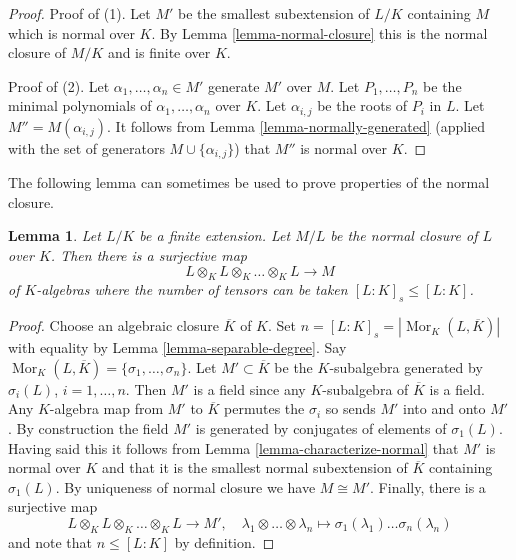\documentclass{stacks-project}
\theoremstyle{plain}
\newtheorem{lemma}[subsection]{Lemma}
\theoremstyle{definition}
\theoremstyle{remark}
\numberwithin{equation}{subsection}
\def\Mor{\mathop{\mathrm{Mor}}\nolimits}
\begin{document}
\begin{proof}
Proof of (1). Let $M'$ be the smallest subextension of $L/K$ containing $M$
which is normal over $K$. By Lemma \ref{lemma-normal-closure}
this is the normal closure of $M/K$ and is finite over $K$.

\medskip\noindent
Proof of (2). Let $\alpha_1, \ldots, \alpha_n \in M'$ generate $M'$ over $M$.
Let $P_1, \ldots, P_n$ be the minimal polynomials of
$\alpha_1, \ldots, \alpha_n$ over $K$. Let $\alpha_{i, j}$ be the roots
of $P_i$ in $L$. Let $M''  = M(\alpha_{i, j})$. It follows from
Lemma \ref{lemma-normally-generated}
(applied with the set of generators $M \cup \{\alpha_{i, j}\}$)
that $M''$ is normal over $K$.
\end{proof}

\noindent
The following lemma can sometimes be used to prove properties
of the normal closure.

\begin{lemma}
\label{lemma-normal-closure-tensor-product}
Let $L/K$ be a finite extension. Let $M/L$ be the normal
closure of $L$ over $K$. Then there is a surjective map
$$
L \otimes_K L \otimes_K \ldots \otimes_K L \longrightarrow M
$$
of $K$-algebras where the number of tensors can be taken
$[L : K]_s \leq [L : K]$.
\end{lemma}

\begin{proof}
Choose an algebraic closure $\overline{K}$ of $K$.
Set $n = [L : K]_s = |\Mor_K(L, \overline{K})|$ with equality by
Lemma \ref{lemma-separable-degree}.
Say $\Mor_K(L, \overline{K}) = \{\sigma_1, \ldots, \sigma_n\}$.
Let $M' \subset \overline{K}$ be the $K$-subalgebra
generated by $\sigma_i(L)$, $i = 1, \ldots, n$. Then $M'$ is
a field since any $K$-subalgebra of $\overline{K}$ is a field.
Any $K$-algebra map from $M'$ to $\overline{K}$ permutes the $\sigma_i$
so sends $M'$ into and onto $M'$. By construction the field $M'$
is generated by conjugates of elements of $\sigma_1(L)$. Having said
this it follows from Lemma \ref{lemma-characterize-normal}
that $M'$ is normal over $K$ and that it is the
smallest normal subextension of $\overline{K}$ containing
$\sigma_1(L)$. By uniqueness of normal closure we have $M \cong M'$.
Finally, there is a surjective map
$$
L \otimes_K L \otimes_K \ldots \otimes_K L \longrightarrow M',
\quad
\lambda_1 \otimes \ldots \otimes \lambda_n \longmapsto
\sigma_1(\lambda_1) \ldots \sigma_n(\lambda_n)
$$
and note that $n \leq [L : K]$ by definition.
\end{proof}
\end{document}
